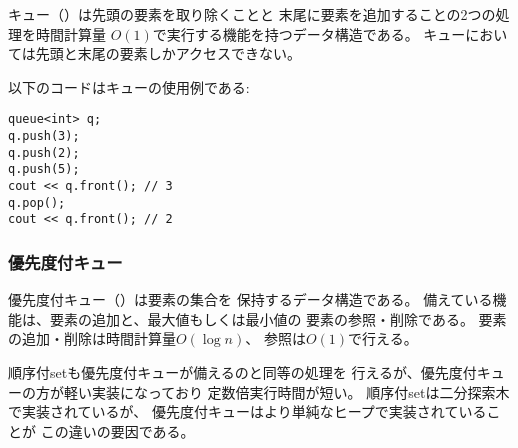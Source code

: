 
キュー（）は先頭の要素を取り除くことと
末尾に要素を追加することの2つの処理を時間計算量
$O(1)$で実行する機能を持つデータ構造である。
キューにおいては先頭と末尾の要素しかアクセスできない。

以下のコードはキューの使用例である:
\begin{lstlisting}
queue<int> q;
q.push(3);
q.push(2);
q.push(5);
cout << q.front(); // 3
q.pop();
cout << q.front(); // 2
\end{lstlisting}

\begin{comment}
\subsubsection{Priority queue}

\index{priority queue}
\index{heap}

A \key{priority queue}
maintains a set of elements.
The supported operations are insertion and,
depending on the type of the queue,
retrieval and removal of
either the minimum or maximum element.
Insertion and removal take $O(\log n)$ time,
and retrieval takes $O(1)$ time.
\end{comment}

\subsubsection{優先度付キュー}


優先度付キュー（）は要素の集合を
保持するデータ構造である。
備えている機能は、要素の追加と、最大値もしくは最小値の
要素の参照・削除である。
要素の追加・削除は時間計算量$O(\log n)$、
参照は$O(1)$で行える。

\begin{comment}
While an ordered set efficiently supports
all the operations of a priority queue,
the benefit of using a priority queue is
that it has smaller constant factors.
A priority queue is usually implemented using
a heap structure that is much simpler than a
balanced binary tree used in an ordered set.
\end{comment}

順序付setも優先度付キューが備えるのと同等の処理を
行えるが、優先度付キューの方が軽い実装になっており
定数倍実行時間が短い。
順序付setは二分探索木で実装されているが、
優先度付キューはより単純なヒープで実装されていることが
この違いの要因である。


